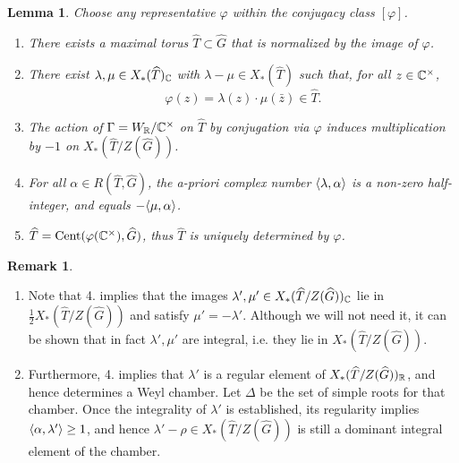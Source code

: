 \documentclass{article}
\newtheorem{lem}[thm]{Lemma}
\theoremstyle{definition}
\newtheorem{rem}[thm]{Remark}
\numberwithin{equation}{section}
\renewcommand{\-}{\hyp{}}
\begin{document}
\begin{lem} \label{lem:icreg}
Choose any representative $\varphi$ within the conjugacy class $[\varphi]$. 
\begin{enumerate}
\item There exists a maximal torus $\hat T \subset \hat G$ that is normalized by the image of $\varphi$. 
\item There exist $\lambda,\mu \in X_*(\widehat T)_{\mathbb{C}}$ with $\lambda-\mu \in X_*(\hat T)$ such that, for all $z \in \mathbb{C}^\times$,
\[ \varphi(z) = \lambda(z) \cdot \mu(\bar z) \in \hat T. \]
\item The action of $\Gamma=W_{\mathbb{R}}/\mathbb{C}^\times$ on $\hat T$ by conjugation via $\varphi$ induces multiplication by $-1$ on $X_*(\hat T/Z(\hat G))$.
\item For all $\alpha \in R(\hat T,\hat G)$, the a-priori complex number $\langle\lambda,\alpha\rangle$ is a non-zero half-integer, and equals $-\langle\mu,\alpha\rangle$.
\item $\widehat T=\textrm{Cent}(\varphi(\mathbb{C}^\times),\widehat G)$, thus $\hat T$ is uniquely determined by $\varphi$.
\end{enumerate}
\end{lem}

\begin{rem}
	\begin{enumerate}
		\item Note that 4. implies that the images $\lambda',\mu' \in X_*(\widehat T/Z(\widehat G))_{\mathbb{C}}$ lie in $\tfrac{1}{2}X_*(\hat T/Z(\hat G))$ and satisfy $\mu'=-\lambda'$. Although we will not need it, it can be shown that in fact $\lambda',\mu'$ are integral, i.e. they lie in $X_*(\hat T/Z(\hat G))$.
  		\item Furthermore, 4. implies that $\lambda'$ is a regular element of $X_*(\widehat T/Z(\widehat G))_{\mathbb{R}}$, and hence determines a Weyl chamber. Let $\Delta$ be the set of simple roots for that chamber. Once the integrality of $\lambda'$ is established, its regularity implies $\langle\alpha,\lambda'\rangle \geq 1$, and hence $\lambda'-\rho \in X_*(\hat T/Z(\hat G))$ is still a dominant integral element of the chamber.
	\end{enumerate}

\end{rem}
\end{document}
